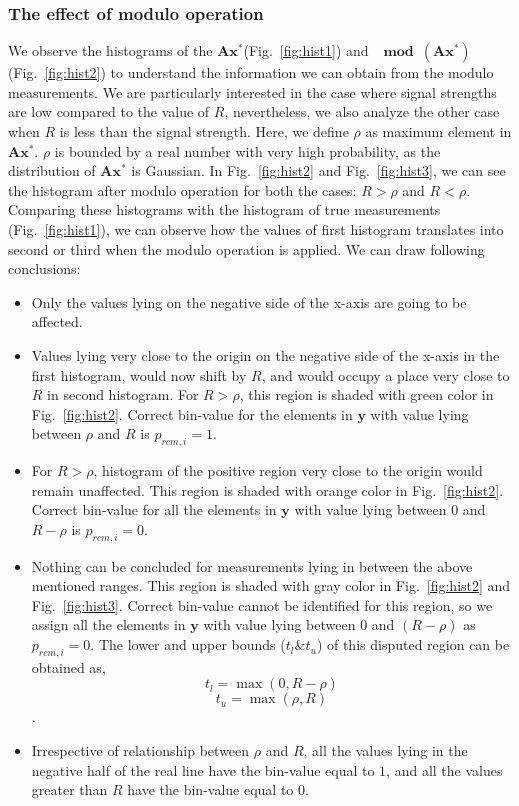 \subsubsection{The effect of modulo operation} 
\label{sec:modeff}
We observe the histograms of the $\mathbf{Ax^*}$(Fig.~\ref{fig:hist1}) and $\mathbf{\mod(\mathbf{Ax^*})}$(Fig.~\ref{fig:hist2}) to understand the information we can obtain from the modulo measurements. We are particularly interested in the case where signal strengths are low compared to the value of $R$, nevertheless, we also analyze the other case when $R$ is less than the signal strength. Here, we define $\rho$ as maximum element in $\mathbf{Ax^*}$. $\rho$ is bounded by a real number with very high probability, as the distribution of $\mathbf{Ax^*}$ is Gaussian.
In Fig.~\ref{fig:hist2} and Fig.~\ref{fig:hist3}, we can see the histogram after modulo operation for both the cases: $R>\rho$ and $R<\rho$. Comparing these histograms with the histogram of true measurements (Fig.~\ref{fig:hist1}), we can observe how the values of first histogram translates into second or third when the modulo operation is applied. We can draw following conclusions:
\begin{itemize}
	\item Only the values lying on the negative side of the x-axis are going to be affected.
	\item Values lying very close to the origin on the negative side of the x-axis in the first histogram, would now shift by $R$, and would occupy a place very close to $R$ in second histogram. For $R>\rho$, this region is shaded with green color in Fig.~\ref{fig:hist2}. Correct bin-value for the elements in $\mathbf{y}$ with value lying between $\rho$ and $R$ is $p_{rcm,i} = 1$.
	\item For $R>\rho$, histogram of the positive region very close to the origin would remain unaffected. This region is shaded with orange color in Fig.~\ref{fig:hist2}. Correct bin-value for all the elements in $\mathbf{y}$ with value lying between $0$ and $R-\rho$ is $p_{rcm,i} = 0$.
	\item Nothing can be concluded for measurements lying in between the above mentioned ranges. This region is shaded with gray color in Fig.~\ref{fig:hist2} and Fig.~\ref{fig:hist3}. Correct bin-value cannot be identified for this region, so we assign all the elements in $\mathbf{y}$ with value lying between $0$ and $(R-\rho)$ as $p_{rcm,i} = 0$. The lower and upper bounds ($t_l \& t_u$) of this disputed region can be obtained as, 
	$$t_l = \max(0, R-\rho)$$
	$$t_u = \max(\rho, R)$$.
	\item Irrespective of relationship between $\rho$ and $R$, all the values lying in the negative half of the real line have the bin-value equal to $1$, and all the values greater than $R$ have the bin-value equal to $0$.
\end{itemize}

